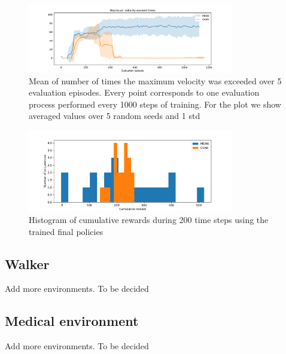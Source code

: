 \begin{figure}[ht]
    \centering
    \includegraphics[width=0.8\textwidth]{images/Cheetah_offpolicy_medium/times_exceedvel_withstds.pdf}
    \caption{Mean of number of times the maximum velocity was exceeded over 5 evaluation episodes.
    Every point corresponds to one evaluation process performed every 1000 steps of training.
    For the plot we show averaged values over 5 random seeds and 1 std}
    \label{vel_exceed_cheetah}

\end{figure}

\begin{figure}[ht]
    \centering
    \includegraphics[width=0.8\textwidth]{images/Cheetah_offpolicy_medium/hist_evaluation_numevalsteps200.pdf}
    \caption{Histogram of cumulative rewards during 200 time steps using the trained final policies}
    \label{hist_cum_rewards200steps_cheetah}

\end{figure}

\clearpage

\subsection{Walker}
Add more environments. To be decided
\subsection{Medical environment}
Add more environments. To be decided